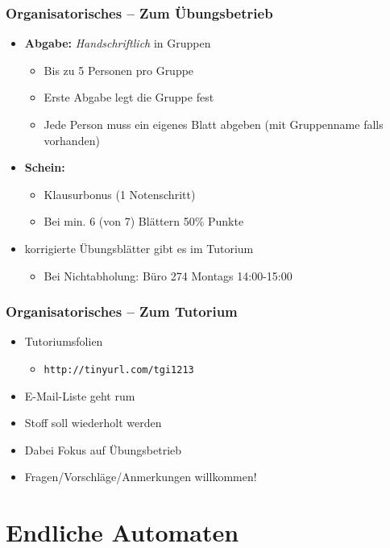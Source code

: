 \begin{frame}
	\frametitle{Organisatorisches -- Zum Übungsbetrieb}
	\begin{itemize}
		\item \textbf{Abgabe:} \emph{Handschriftlich} in Gruppen
		\begin{itemize}
			\item Bis zu 5 Personen pro Gruppe
			\item Erste Abgabe legt die Gruppe fest
			\item Jede Person muss ein eigenes Blatt abgeben (mit Gruppenname falls vorhanden)
		\end{itemize}
		\item \textbf{Schein:} 
		\begin{itemize}
			\item Klausurbonus (1 Notenschritt)
			\item Bei min. 6 (von 7) Blättern 50\% Punkte
		\end{itemize}
		\item korrigierte Übungsblätter gibt es im Tutorium
		\begin{itemize}
			\item Bei Nichtabholung: Büro 274 Montags 14:00-15:00
		\end{itemize}
	\end{itemize}
\end{frame}
\begin{frame}
	\frametitle{Organisatorisches -- Zum Tutorium}
	\begin{itemize}
	\item Tutoriumsfolien
		\begin{itemize}
			\item \texttt{http://tinyurl.com/tgi1213}
		\end{itemize}
		\item E-Mail-Liste geht rum
		\item Stoff soll wiederholt werden
		\item Dabei Fokus auf Übungsbetrieb
		\item Fragen/Vorschläge/Anmerkungen willkommen!
	\end{itemize}
\end{frame}
\section{Endliche Automaten}
